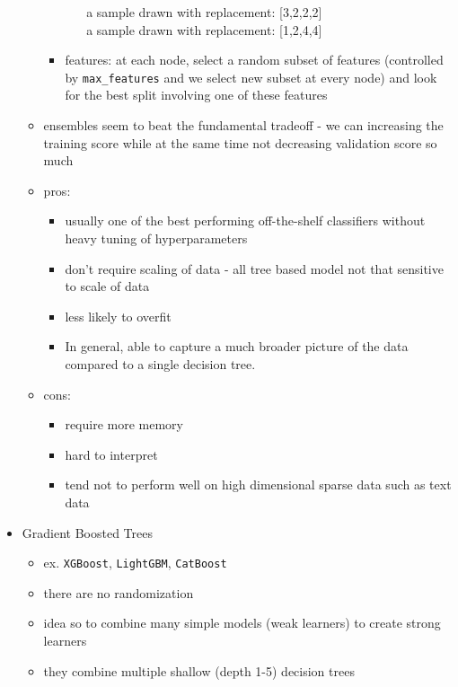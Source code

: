 \documentclass[10.5pt,a4paper, fleqn, dvipsnames]{article}
\begin{document}
\begin{itemize}
\begin{itemize}
\begin{itemize}[leftmargin = 2em ]
\begin{itemize}
                a sample drawn with replacement: [3,2,2,2]\\
                a sample drawn with replacement: [1,2,4,4]
            \end{itemize}
            \item features: at each node, select a random subset of features (controlled by \lstinline{max_features} and we select new subset at every node) and look for the best split involving one of these features
        \end{itemize}
        \item ensembles seem to beat the fundamental tradeoff - we can increasing the training score while at the same time not decreasing validation score so much 
        \item pros:
        \begin{itemize}[leftmargin = 2em ]
            \item usually one of the best performing off-the-shelf classifiers without heavy tuning of hyperparameters
            \item don't require scaling of data - all tree based model not that sensitive to scale of data
            \item less likely to overfit
            \item In general, able to capture a much broader picture of the data compared to a single decision tree.
        \end{itemize}
        \item cons:
        \begin{itemize}[leftmargin = 2em]
            \item require more memory
            \item hard to interpret
            \item tend not to perform well on high dimensional sparse data such as text data
        \end{itemize}
    \end{itemize}
    \item Gradient Boosted Trees
    \begin{itemize}
        \item ex. \lstinline{XGBoost}, \lstinline{LightGBM}, \lstinline{CatBoost} 
        \item there are no randomization
        \item idea so to combine many simple models (weak learners) to create strong learners
        \item they combine multiple shallow (depth 1-5) decision trees 

\end{itemize}
\end{itemize}
\end{document}
